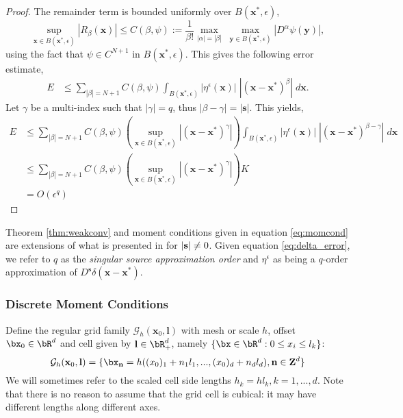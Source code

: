 \begin{proof}
The remainder term is bounded uniformly over $B(\mathbf x^*,\epsilon)$,
\[
	\underset{\mathbf x\in B(\mathbf x^*,\epsilon)}{\sup} |R_\beta(\mathbf x)| \le C(\beta,\psi) := \frac{1}{\beta!} \max_{|\alpha|=|\beta|} \; \max_{\mathbf y\in B(\mathbf x^*,\epsilon)} |D^{\alpha}\psi(\mathbf y)|,
\]
using the fact that $\psi\in C^{N+1}$ in $B(\mathbf x^*,\epsilon)$.
This gives the following error estimate,
\begin{align*}
	 E
	 & \le \sum_{|\beta|=N+1} C(\beta,\psi) \int_{B(\mathbf x^*,\epsilon)} 
	  |\eta^\epsilon(\mathbf x)| \; |(\mathbf x-\mathbf x^*)^\beta| \; d\mathbf x.
\end{align*}
Let $\gamma$ be a multi-index such that $|\gamma|=q$, thus $|\beta-\gamma| = |\mathbf s|$.
This yields,
\begin{align*}
	E
	&\le \sum_{|\beta|=N+1} C(\beta,\psi) \left( \sup_{\mathbf x\in B(\mathbf x^*,\epsilon)} \left|(\mathbf x-\mathbf x^*)^{\gamma}\right|\right) 
	\int_{B(\mathbf x^*,\epsilon)} |\eta^\epsilon(\mathbf x)| \; |(\mathbf x-\mathbf x^*)^{\beta-\gamma}| \; d\mathbf x \\
	&\le \sum_{|\beta|=N+1} C(\beta,\psi) \left( \sup_{\mathbf x\in B(\mathbf x^*,\epsilon)} \left|(\mathbf x-\mathbf x^*)^{\gamma}\right|\right)  K\\
	&= O(\epsilon^q)
\end{align*}
\end{proof}

Theorem \ref{thm:weakconv} and moment conditions given in equation \ref{eq:momcond} are extensions of what is presented in \cite{hoss:16} for $|{\bf s}|\neq0$.
Given equation \ref{eq:delta_error}, we refer to $q$ as the \emph{singular source approximation order} and $\eta^\epsilon$ as being a $q$-order approximation of $D^{\mathbf s}\delta(\mathbf x-\mathbf x^*)$.


\subsubsection{Discrete Moment Conditions}

Define the regular grid family $\mathcal G_h(\mathbf x_0,\mathbf l)$
with mesh or scale $h$, offset $\bx_0 \in
\bR^d$ and cell given by ${\bf l} \in \bR_+^d$, namely $\{\bx \in
\bR^d: 0 \le x_i\le l_k\}$:
\[
	\mathcal G_h(\mathbf x_0,\mathbf l) = \{\bx_{\bf n} =
        h((x_0)_1+n_1l_1,...,(x_0)_d+n_dl_d), {\bf n} \in {\bf Z}^d\}
\]
We will sometimes refer to the scaled cell side lengths $h_k=hl_k,k=1,...,d$.
Note that there is no reason to assume that the grid cell is cubical: it may have different lengths along different axes.

